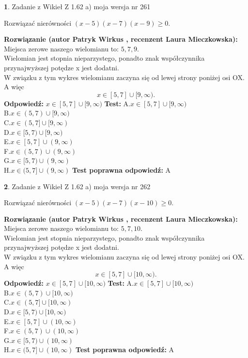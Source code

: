 \documentclass[12pt, a4paper]{article}
\theoremstyle{definition} %
\newtheorem{zad}{}
\newcommand{\zadStart}[1]{\begin{zad}#1\newline}
\newcommand{\zadStop}{\end{zad}}
\newcommand{\rozwStart}[2]{\noindent \textbf{Rozwiązanie (autor #1 , recenzent #2): }\newline}
\newcommand{\rozwStop}{\newline}
\newcommand{\odpStart}{\noindent \textbf{Odpowiedź:}\newline}
\newcommand{\odpStop}{\newline}
\newcommand{\testStart}{\noindent \textbf{Test:}\newline}
\newcommand{\testStop}{\newline}
\newcommand{\kluczStart}{\noindent \textbf{Test poprawna odpowiedź:}\newline}
\newcommand{\kluczStop}{\newline}
\begin{document}
\zadStart{Zadanie z Wikieł Z 1.62 a) moja wersja nr 261}

Rozwiązać nierówności $(x-5)(x-7)(x-9)\ge0$.
\zadStop
\rozwStart{Patryk Wirkus}{Laura Mieczkowska}
Miejsca zerowe naszego wielomianu to: $5, 7, 9$.\\
Wielomian jest stopnia nieparzystego, ponadto znak współczynnika przy\linebreak najwyższej potędze x jest dodatni.\\ W związku z tym wykres wielomianu zaczyna się od lewej strony poniżej osi OX. A więc $$x \in [5,7] \cup [9,\infty).$$
\rozwStop
\odpStart
$x \in [5,7] \cup [9,\infty)$
\odpStop
\testStart
A.$x \in [5,7] \cup [9,\infty)$\\
B.$x \in (5,7) \cup [9,\infty)$\\
C.$x \in (5,7] \cup [9,\infty)$\\
D.$x \in [5,7) \cup [9,\infty)$\\
E.$x \in [5,7] \cup (9,\infty)$\\
F.$x \in (5,7) \cup (9,\infty)$\\
G.$x \in [5,7) \cup (9,\infty)$\\
H.$x \in (5,7] \cup (9,\infty)$
\testStop
\kluczStart
A
\kluczStop



\zadStart{Zadanie z Wikieł Z 1.62 a) moja wersja nr 262}

Rozwiązać nierówności $(x-5)(x-7)(x-10)\ge0$.
\zadStop
\rozwStart{Patryk Wirkus}{Laura Mieczkowska}
Miejsca zerowe naszego wielomianu to: $5, 7, 10$.\\
Wielomian jest stopnia nieparzystego, ponadto znak współczynnika przy\linebreak najwyższej potędze x jest dodatni.\\ W związku z tym wykres wielomianu zaczyna się od lewej strony poniżej osi OX. A więc $$x \in [5,7] \cup [10,\infty).$$
\rozwStop
\odpStart
$x \in [5,7] \cup [10,\infty)$
\odpStop
\testStart
A.$x \in [5,7] \cup [10,\infty)$\\
B.$x \in (5,7) \cup [10,\infty)$\\
C.$x \in (5,7] \cup [10,\infty)$\\
D.$x \in [5,7) \cup [10,\infty)$\\
E.$x \in [5,7] \cup (10,\infty)$\\
F.$x \in (5,7) \cup (10,\infty)$\\
G.$x \in [5,7) \cup (10,\infty)$\\
H.$x \in (5,7] \cup (10,\infty)$
\testStop
\kluczStart
A
\kluczStop
\end{document}
